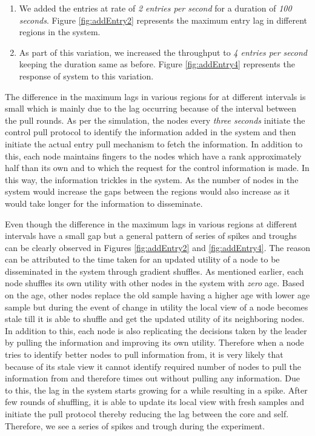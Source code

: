 \documentclass[a4paper,11pt]{kth-mag}
\begin{document}
\begin{enumerate}

\item We added the entries at rate of \textit{2 entries per second} for a duration of  \textit{100 seconds}. Figure \ref{fig:addEntry2} represents the maximum entry lag in different regions in the system.

\item As part of this variation, we increased the throughput to \textit{4 entries per second} keeping the duration same as before. Figure \ref{fig:addEntry4} represents the response of system to this variation.

\end{enumerate}


The difference in the maximum lags in various regions for at different intervals is small which is mainly due to the lag occurring because of the interval between the pull rounds. As per the simulation, the nodes every \textit{three seconds} initiate the control pull protocol to identify the information added in the system and then initiate the actual entry pull mechanism to fetch the information. In addition to this, each node maintains fingers to the nodes which have a rank approximately half than its own and to which the request for the control information is made. In this way, the information trickles in the system. As the number of nodes in the system would increase the gaps between the regions would also increase as it would take longer for the information to disseminate. 

\par Even though the difference in the maximum lags in various regions at different intervals have a small gap but a general pattern of series of spikes and troughs can be clearly observed in Figures \ref{fig:addEntry2} and \ref{fig:addEntry4}. The reason can be attributed to the time taken for an updated utility of a node to be disseminated in the system through gradient shuffles. As mentioned earlier, each node shuffles its own utility with other nodes in the system with \textit{zero} age. Based on the age, other nodes replace the old sample having a higher age with lower age sample but during the event of change in utility the local view of a node becomes stale till it is able to shuffle and get the updated utility of its neighboring nodes. In addition to this, each node is also replicating the decisions taken by the leader by pulling the information and improving its own utility. Therefore when a node tries to identify better nodes to pull information from, it is very likely that because of its stale view it cannot identify required number of nodes to pull the information from and therefore times out without pulling any information.  Due to this, the lag in the system starts growing for a while resulting in a spike. After few rounds of shuffling, it is able to update its local view with fresh samples and initiate the pull protocol thereby reducing the lag between the core and self. Therefore, we see a series of spikes and trough during the experiment.
\end{document}

